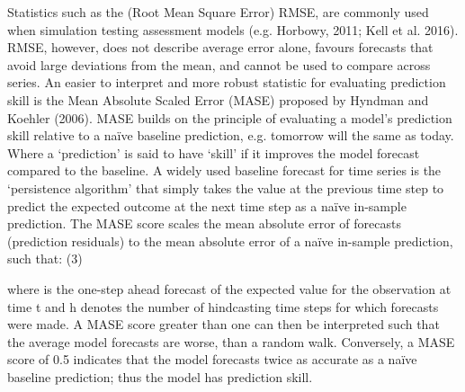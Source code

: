 Statistics such as the (Root Mean Square Error) RMSE, are commonly used when simulation testing assessment models (e.g. Horbowy, 2011; Kell et al. 2016). RMSE, however, does not describe average error alone, favours forecasts that avoid large deviations from the mean, and cannot be used to compare across series. An easier to interpret and more robust statistic for evaluating prediction skill is the Mean Absolute Scaled Error (MASE) proposed by Hyndman and Koehler (2006). MASE builds on the principle of evaluating a model’s prediction skill relative to a naïve baseline prediction, e.g. tomorrow will the same as today. Where a ‘prediction’ is said to have ‘skill’ if it improves the model forecast compared to the baseline. A widely used baseline forecast for time series is the ‘persistence algorithm’ that simply takes the value at the previous time step to predict the expected outcome at the next time step as a naïve in-sample prediction. The MASE score scales the mean absolute error of forecasts (prediction residuals) to the mean absolute error of a naïve in-sample prediction, such that:
									(3)

where  is the one-step ahead forecast of the expected value for the observation at time t and h denotes the number of hindcasting time steps for which forecasts   were made. A MASE score greater than one can then be interpreted such that the average model forecasts are worse, than a random walk. Conversely, a MASE score of 0.5 indicates that the model forecasts twice as accurate as a naïve baseline prediction; thus the model has prediction skill.  

